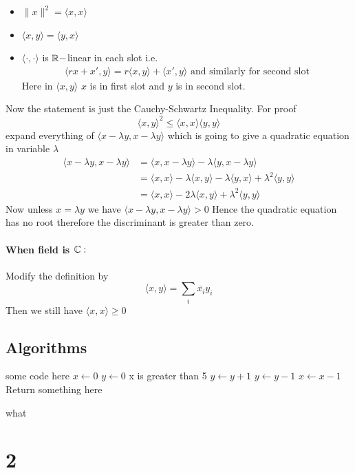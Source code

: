 \documentclass{report}
\begin{document}
{	\begin{note}
		\begin{itemize}
			\item $\|x\|^2=\langle x,x\rangle$
			\item $\langle x,y\rangle=\langle y,x\rangle$
			\item $\langle \cdot,\cdot\rangle$ is $\mathbb{R}-$linear in each slot i.e. \begin{align*}
				      \langle rx+x',y\rangle=r\langle x,y\rangle+\langle x',y\rangle	\text{ and similarly for second slot}
			      \end{align*}Here in $\langle x,y\rangle$ $x$ is in first slot and $y$ is in second slot.
		\end{itemize}
	\end{note}Now the statement is just the Cauchy-Schwartz Inequality. For proof $$\langle x,y\rangle^2\leq \langle x,x\rangle\langle y,y\rangle $$ expand everything of $\langle x-\lambda y,x-\lambda y\rangle$ which is going to give a quadratic equation in variable $\lambda $ \begin{align*}
		\langle x-\lambda y,x-\lambda y\rangle & =\langle x,x-\lambda y\rangle-\lambda\langle y,x-\lambda y\rangle                                       \\
		                                       & =\langle x ,x\rangle -\lambda\langle x,y\rangle -\lambda\langle y,x\rangle +\lambda^2\langle y,y\rangle \\
		                                       & =\langle x,x\rangle -2\lambda\langle x,y\rangle+\lambda^2\langle y,y\rangle
	\end{align*}Now unless $x=\lambda y$ we have $\langle x-\lambda y,x-\lambda y\rangle>0$ Hence the quadratic equation has no root therefore the discriminant is greater than zero.

	\subsubsection*{\textbf{When field is $\mathbb{C}:$}}Modify the definition by $$\langle x,y\rangle=\sum_i\overline{x_i}y_i$$Then we still have $\langle x,x\rangle\geq 0$}

\section{Algorithms}
\begin{algorithm}[H]
\SetAlgoLined
\SetNoFillComment
{}
\vspace{3mm}
some code here\;
$x \leftarrow 0$\;
$y \leftarrow 0$\;
 {
    x is greater than 5 
}
 {
    $y \leftarrow y + 1$\;
}
 {
    $y \leftarrow y - 1$\;
}
 {
    $x \leftarrow x - 1$\;
}
\Return Return something here\;
\caption{what}
\end{algorithm}
\chapter{2}
\end{document}
